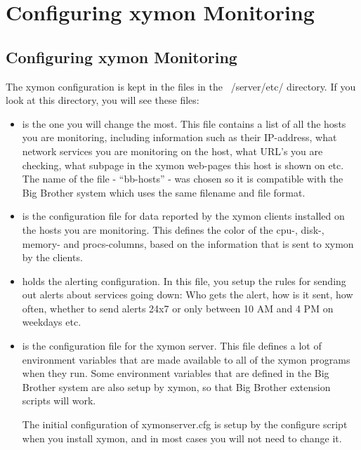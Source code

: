 \chapter{Configuring xymon Monitoring}
\section{Configuring xymon Monitoring}


 The xymon configuration is kept in the files in the ~/server/etc/
 directory. If you look at this directory, you will see these files:

\begin{itemize}
\item {} is the one you will change the most. This file contains
  a list of all the hosts you are monitoring, including information
  such as their IP-address, what network services you are monitoring
  on the host, what URL's you are checking, what subpage in the xymon
  web-pages this host is shown on etc. The name of the file -
  ``bb-hosts'' - was chosen so it is compatible with the Big Brother
  system which uses the same filename and file format.

\item {} is the configuration file for data reported
  by the xymon clients installed on the hosts you are
  monitoring. This defines the color of the cpu-, disk-, memory- and
  procs-columns, based on the information that is sent to xymon by
  the clients.

\item {} holds the alerting configuration. In this
  file, you setup the rules for sending out alerts about services
  going down: Who gets the alert, how is it sent, how often, whether
  to send alerts 24x7 or only between 10 AM and 4 PM on weekdays etc.

\item {} is the configuration file for the xymon
  server. This file defines a lot of environment variables that are
  made available to all of the xymon programs when they run. Some
  environment variables that are defined in the Big Brother system are
  also setup by xymon, so that Big Brother extension scripts will
  work. 

The initial configuration of xymonserver.cfg is setup by the
configure script when you install xymon, and in most cases you will
not need to change it.


\end{itemize}
